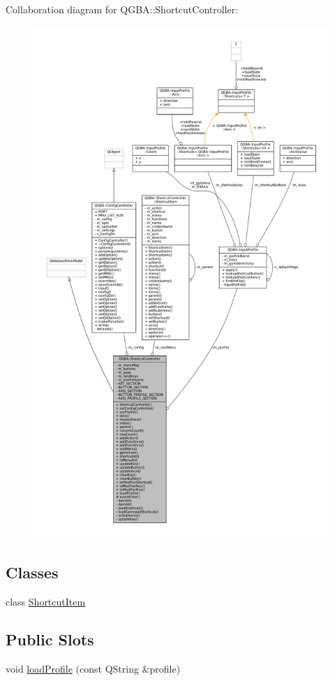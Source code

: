 Collaboration diagram for Q\+G\+BA\+:\+:Shortcut\+Controller\+:
\nopagebreak
\begin{figure}[H]
\begin{center}
\leavevmode
\includegraphics[height=550pt]{class_q_g_b_a_1_1_shortcut_controller__coll__graph}
\end{center}
\end{figure}
\subsection*{Classes}
\begin{DoxyCompactItemize}
\item 
class \mbox{\hyperlink{class_q_g_b_a_1_1_shortcut_controller_1_1_shortcut_item}{Shortcut\+Item}}
\end{DoxyCompactItemize}
\subsection*{Public Slots}
\begin{DoxyCompactItemize}
\item 
void \mbox{\hyperlink{class_q_g_b_a_1_1_shortcut_controller_a9cef8d1b6210a7648f716467f80abd63}{load\+Profile}} (const Q\+String \&profile)
\end{DoxyCompactItemize}
